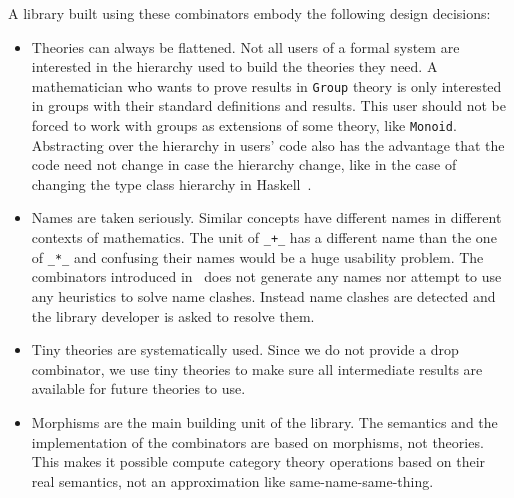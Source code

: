 A library built using these combinators embody the following design decisions:
\begin{itemize}
    \item Theories can always be flattened. Not all users of a formal system are interested in the hierarchy used to build the theories they need. A mathematician who wants to prove results in \verb|Group| theory is only interested in groups with their standard definitions and results. This user should not be forced to work with groups as extensions of some theory, like \verb|Monoid|. Abstracting over the hierarchy in users' code also has the advantage that the code need not change in case the hierarchy change, like in the case of changing the type class hierarchy in Haskell~\cite{wiki:haskell_hierarch}. 
    \item Names are taken seriously. Similar concepts have different names in different contexts of mathematics. The unit of \verb|_+_| has a different name than the one of \verb|_*_| and confusing their names would be a huge usability problem. The combinators introduced in~\cite{carette2018building} does not generate any names nor attempt to use any heuristics to solve name clashes. Instead name clashes are detected and the library developer is asked to resolve them.  
    \item Tiny theories are systematically used. Since we do not provide a drop combinator, we use tiny theories to make sure all intermediate results are available for future theories to use. 
    \item Morphisms are the main building unit of the library. The semantics and the implementation of the combinators are based on morphisms, not theories. This makes it possible compute category theory operations based on their real semantics, not an approximation like same-name-same-thing. 
\end{itemize}


